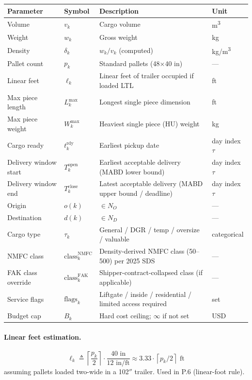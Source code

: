 \documentclass[11pt,a4paper]{article}
\newcommand{\ceil}[1]{\left\lceil #1 \right\rceil}
\newcommand{\defeq}{\triangleq}
\theoremstyle{definition}
\begin{document}
\begin{center}
\begin{tabular}{llp{6.5cm}l}
\toprule
Parameter & Symbol & Description & Unit \\
\midrule
Volume & $v_k$ & Cargo volume & m\textsuperscript{3} \\
Weight & $w_k$ & Gross weight & kg \\
Density & $\delta_k$ & $w_k / v_k$ (computed) & kg/m\textsuperscript{3} \\
Pallet count & $p_k$ & Standard pallets (48$\times$40 in) & — \\
Linear feet & $\ell_k$ & Linear feet of trailer occupied if loaded LTL & ft \\
Max piece length & $L_k^{\max}$ & Longest single piece dimension & ft \\
Max piece weight & $W_k^{\max}$ & Heaviest single piece (HU) weight & kg \\
Cargo ready & $t_k^{\text{rdy}}$ & Earliest pickup date & day index $\tau$ \\
Delivery window start & $T_k^{\text{open}}$ & Earliest acceptable delivery (MABD lower bound) & day index $\tau$ \\
Delivery window end & $T_k^{\text{close}}$ & Latest acceptable delivery (MABD upper bound / deadline) & day index $\tau$ \\
Origin & $o(k)$ & $\in N_O$ & — \\
Destination & $d(k)$ & $\in N_D$ & — \\
Cargo type & $\tau_k$ & General / DGR / temp / oversize / valuable & categorical \\
NMFC class & $\text{class}_k^{\text{NMFC}}$ & Density-derived NMFC class (50--500) per 2025 SDS & — \\
FAK class override & $\text{class}_k^{\text{FAK}}$ & Shipper-contract-collapsed class (if applicable) & — \\
Service flags & $\text{flags}_k$ & Liftgate / inside / residential / limited access required & set \\
Budget cap & $B_k$ & Hard cost ceiling; $\infty$ if not set & USD \\
\bottomrule
\end{tabular}
\end{center}

\paragraph{Linear feet estimation.}
\begin{equation}
  \ell_k \defeq \ceil{\frac{p_k}{2}} \cdot \frac{40\text{ in}}{12\text{ in/ft}}
        \approx 3.33 \cdot \ceil{p_k / 2}\text{ ft}
  \label{eq:linear-feet}
\end{equation}
assuming pallets loaded two-wide in a 102$''$ trailer. Used in P.6 (linear-foot rule).
\end{document}
